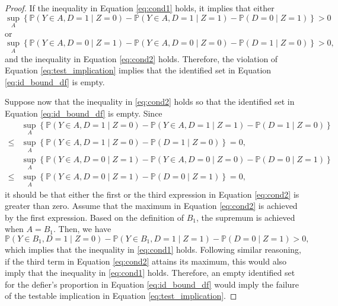 \documentclass[12pt]{article}
\theoremstyle{plain}
\theoremstyle{definition}
\theoremstyle{remark}
\begin{document}
\begin{proof}
If the inequality in Equation \eqref{eq:cond1} holds, it implies that either 
\begin{equation*}
    \sup_A \left\{\mathbb{P}\left(Y \in A, D = 1 \mid Z = 0\right) - \mathbb{P}\left(Y \in A, D = 1 \mid Z = 1\right) - \mathbb{P}\left(D = 0 \mid Z = 1\right)\right\} > 0
\end{equation*}
or 
\begin{equation*}
    \sup_A \left\{\mathbb{P}\left(Y \in A, D = 0 \mid Z = 1\right) - \mathbb{P}\left(Y \in A, D = 0 \mid Z = 0\right) - \mathbb{P}\left(D = 1 \mid Z = 0\right)\right\} > 0,
\end{equation*}
and the inequality in Equation \eqref{eq:cond2} holds. Therefore, the violation of Equation \eqref{eq:test_implication} implies that the identified set in Equation \eqref{eq:id_bound_df} is empty.

Suppose now that the inequality in \eqref{eq:cond2} holds so that the identified set in Equation \eqref{eq:id_bound_df} is empty. Since 
\begin{equation*}
    \begin{aligned}
        &\sup_A \left\{\mathbb{P}\left(Y \in A, D = 1 \mid Z = 0\right) - \mathbb{P}\left(Y \in A, D = 1 \mid Z = 1\right) - \mathbb{P}\left(D = 1 \mid Z = 0\right)\right\} \\
        \leq&\sup_A \left\{\mathbb{P}\left(Y \in A, D = 1 \mid Z = 0\right) - \mathbb{P}\left(D = 1 \mid Z = 0\right)\right\} = 0, \\
        &\sup_A \left\{\mathbb{P}\left(Y \in A, D = 0 \mid Z = 1\right) - \mathbb{P}\left(Y \in A, D = 0 \mid Z = 0\right) - \mathbb{P}\left(D = 0 \mid Z = 1\right)\right\} \\
        \leq&\sup_A \left\{\mathbb{P}\left(Y \in A, D = 0 \mid Z = 1\right) - \mathbb{P}\left(D = 0 \mid Z = 1\right)\right\} = 0,
    \end{aligned}
\end{equation*}
it should be that either the first or the third expression in Equation \eqref{eq:cond2} is greater than zero. Assume that the maximum in Equation \eqref{eq:cond2} is achieved by the first expression. Based on the definition of $B_1$, the supremum is achieved when $A = B_1$. Then, we have 
\begin{equation*}
    \mathbb{P} \left(Y \in B_1, D = 1 \mid Z = 0\right) - \mathbb{P}\left(Y \in B_1, D = 1 \mid Z = 1\right) - \mathbb{P}\left(D = 0 \mid Z = 1\right) > 0,
\end{equation*}
which implies that the inequality in \eqref{eq:cond1} holds. Following similar reasoning, if the third term in Equation \eqref{eq:cond2} attains its maximum, this would also imply that the inequality in \eqref{eq:cond1} holds. Therefore, an empty identified set for the defier's proportion in Equation \eqref{eq:id_bound_df} would imply the failure of the testable implication in Equation \eqref{eq:test_implication}. 


\end{proof}
\end{document}

